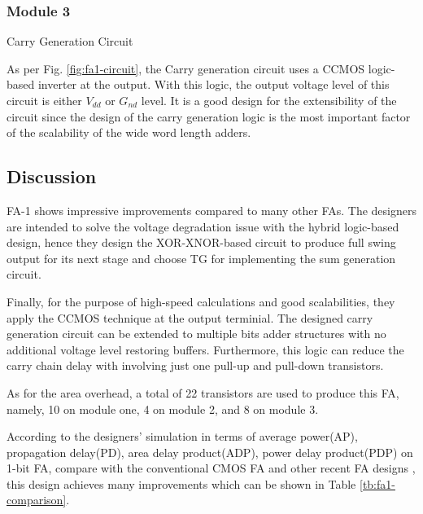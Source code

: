 \documentclass[conference]{IEEEtran}
\begin{document}
\subsubsection{Module 3}Carry Generation Circuit

As per Fig. \ref{fig:fa1-circuit}, the Carry generation circuit uses a CCMOS logic-based inverter at the output.
With this logic, the output voltage level of this circuit is either \(V_{dd}\) or \(G_{nd}\) level.
It is a good design for the extensibility of the circuit
since the design of the carry generation logic is the most important factor of the scalability of the wide word length adders.


\subsection{Discussion}

FA-1 shows impressive improvements compared to many other FAs.
The designers are intended to solve the voltage degradation issue with the hybrid logic-based design,
hence they design the XOR-XNOR-based circuit to produce full swing output for its next stage
and choose TG for implementing the sum generation circuit.

Finally, for the purpose of high-speed calculations and good scalabilities,
they apply the CCMOS technique at the output terminial.
The designed carry generation circuit can be extended to multiple bits adder structures with no additional voltage level restoring buffers.
Furthermore, this logic can reduce the carry chain delay with involving just one pull-up and pull-down transistors.

As for the area overhead, a total of 22 transistors are used to produce this FA, namely, 10 on module one, 4 on module 2, and 8 on module 3.

According to the designers' simulation in terms of average power(AP), propagation delay(PD), area delay product(ADP), power delay product(PDP) on 1-bit FA,
compare with the conventional CMOS FA \cite{weste2015cmos} and other recent FA designs \cite{15484823, 9068497,18743001},
this design achieves many improvements which can be shown in Table \ref{tb:fa1-comparison}.
\end{document}
